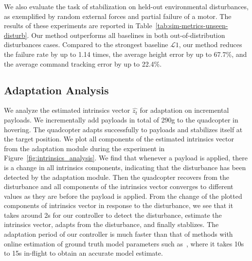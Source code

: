 %
We also evaluate the task of stabilization on held-out environmental disturbances, as exemplified by random external forces and partial failure of a motor. The results of these experiments are reported in Table~\ref{tab:sim-metrics-unseen-disturb}. Our method outperforms all baselines in both out-of-distribution disturbances cases. Compared to the strongest baseline $\mathcal{L}1$, our method reduces the failure rate by up to 1.14 times, the average height error by up to 67.7\%,  and the average command tracking error by up to 22.4\%. 




\subsection{Adaptation Analysis}
We analyze the estimated intrinsics vector $\hat{z_t}$ for adaptation on incremental payloads. We incrementally add payloads in total of 290g to the quadcopter in hovering. The quadcopter adapts successfully to payloads and stabilizes itself at the target position. 
%
We plot all components of the estimated intrinsics vector from the adaptation module during the experiment in Figure~\ref{fig:intrinsics_analysis}. 
%
We find that whenever a payload is applied, there is a change in all intrinsics components, indicating that the disturbance has been detected by the adaptation module. 
%
Then the quadcopter recovers from the disturbance and all components of the intrinsics vector converges to different values as they are before the payload is applied. 
%
From the change of the plotted components of intrinsics vector in response to the disturbance, we see that it takes around 2s for our controller to detect the disturbance, estimate the intrinsics vector, adapts from the disturbance, and finally stablizes. 
%
The adaptation period of our controller is much faster than that of methods with online estimation of ground truth model parameters such as~\cite{wuest2019online}, where it takes 10s to 15s in-flight to obtain an accurate model estimate.
